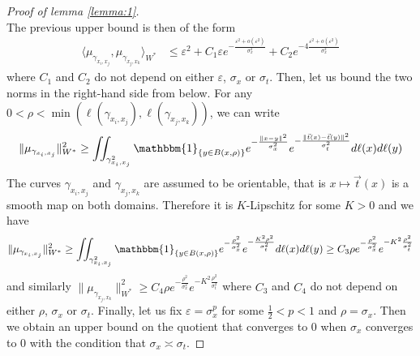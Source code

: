 \documentclass[pdflatex,sn-mathphys-num]{sn-jnl}%
\theoremstyle{thmstyleone}%
\theoremstyle{thmstyletwo}%
\theoremstyle{thmstylethree}%
\begin{document}
\begin{appendices}
\begin{proof}[Proof of lemma \ref{lemma:1}]
\begin{equation*}
\end{equation*}
The previous upper bound is then of the form
\begin{align*}
    \langle \mu_{\gamma_{x_i, x_j}}, \mu_{\gamma_{x_j, x_k}} \rangle_{W^\ast} 
    &\leq \varepsilon^2 + C_1 \varepsilon e^{-\frac{\varepsilon^2 + o(\varepsilon^2)}{\sigma_x^2}} + C_2e^{-4\frac{\varepsilon^2 + o(\varepsilon^2)}{\sigma_x^2}}
\end{align*}
where $C_1$ and $C_2$ do not depend on either $\varepsilon$, $\sigma_x$ or $\sigma_t$. 
\medbreak  
Then, let us bound the two norms in the right-hand side from below. For any $0 < \rho < \min(\ell(\gamma_{x_i, x_j}), \ell(\gamma_{x_j, x_k}))$, we can write
\begin{equation*}
    \|\mu_{\gamma_{x_i, x_j}}\|_{W^\ast}^2 \geq \iint_{\gamma_{x_i, x_j}^2}\mathbbm{1}_{\{y\in B(x, \rho)\}}e^{-\frac{\|x - y\|^2}{\sigma_x^2}}e^{-\frac{\|\vec{t}(x) - \vec{t}(y)\|^2}{\sigma_t^2}}d\ell(x)d\ell(y)
\end{equation*}
The curves $\gamma_{x_i, x_j}$ and $\gamma_{x_j, x_k}$ are assumed to be orientable, that is $x \mapsto \vec{t}(x)$ is a smooth map on both domains. Therefore it is $K$-Lipschitz for some $K>0$ and we have
\begin{equation*}
    \|\mu_{\gamma_{x_i, x_j}}\|_{W^\ast}^2 \geq \iint_{\gamma_{x_i, x_j}^2}\mathbbm{1}_{\{y\in B(x, \rho)\}}e^{-\frac{\rho^2}{\sigma_x^2}}e^{-\frac{K^2\rho^2}{\sigma_t^2}}d\ell(x)d\ell(y)\geq C_3\rho e^{-\frac{\rho^2}{\sigma_x^2}}e^{-K^2\frac{\rho^2}{\sigma_t^2}} 
\end{equation*}
and similarly $\|\mu_{\gamma_{x_j, x_k}}\|_{W^\ast}^2 \geq C_4\rho e^{-\frac{\rho^2}{\sigma_x^2}}e^{-K^2\frac{\rho^2}{\sigma_t^2}}$ where $C_3$ and $C_4$ do not depend on either $\rho$, $\sigma_x$ or $\sigma_t$.
\medbreak
Finally, let us fix $\varepsilon=\sigma_x^p$ for some $\frac{1}{2} < p < 1$ and $\rho=\sigma_x$. Then we obtain an upper bound on the quotient that converges to $0$ when $\sigma_x$ converges to $0$ with the condition that $\sigma_x \asymp \sigma_t$. \qedsymbol
\end{proof}


\end{appendices}
\end{document}
